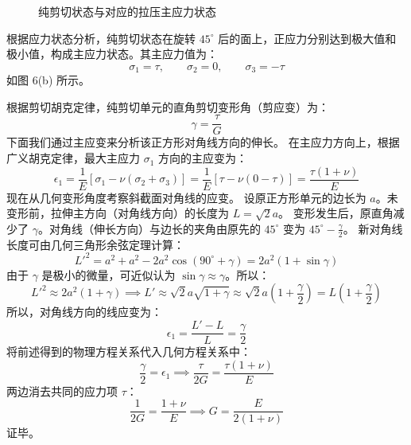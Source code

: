 \documentclass[11pt,a4paper]{ctexrep}
\begin{document}
{\begin{figure}[H]
\caption{纯剪切状态与对应的拉压主应力状态}
\end{figure}

根据应力状态分析，纯剪切状态在旋转 $45^\circ$ 后的面上，正应力分别达到极大值和极小值，构成主应力状态。其主应力值为：
\[
    \sigma_1 = \tau, \qquad \sigma_2 = 0, \qquad \sigma_3 = -\tau
\]
如图 6(b) 所示。

根据剪切胡克定律，纯剪切单元的直角剪切变形角（剪应变）为：
\[
    \gamma = \frac{\tau}{G}
\]
下面我们通过主应变来分析该正方形对角线方向的伸长。
在主应力方向上，根据广义胡克定律，最大主应力 $\sigma_1$ 方向的主应变为：
\[
    \epsilon_1 = \frac{1}{E} \left[ \sigma_1 - \nu (\sigma_2 + \sigma_3) \right] = \frac{1}{E} \left[ \tau - \nu (0 - \tau) \right] = \frac{\tau (1 + \nu)}{E}
\]
现在从几何变形角度考察斜截面对角线的应变。
设原正方形单元的边长为 $a$。未变形前，拉伸主方向（对角线方向）的长度为 $L = \sqrt{2}a$。
变形发生后，原直角减少了 $\gamma$。对角线（伸长方向）与边长的夹角由原先的 $45^\circ$ 变为 $45^\circ - \frac{\gamma}{2}$。
新对角线长度可由几何三角形余弦定理计算：
\[
    L'^2 = a^2 + a^2 - 2a^2 \cos\left(90^\circ + \gamma\right) = 2a^2 (1 + \sin\gamma)
\]
由于 $\gamma$ 是极小的微量，可近似认为 $\sin\gamma \approx \gamma$。所以：
\[
    L'^2 \approx 2a^2 (1 + \gamma) \implies L' \approx \sqrt{2}a \sqrt{1 + \gamma} \approx \sqrt{2}a \left( 1 + \frac{\gamma}{2} \right)
  = L \left( 1 + \frac{\gamma}{2} \right)
\]
所以，对角线方向的线应变为：
\[
    \epsilon_1 = \frac{L' - L}{L} = \frac{\gamma}{2}
\]
将前述得到的物理方程关系代入几何方程关系中：
\[
    \frac{\gamma}{2} = \epsilon_1 \implies \frac{\tau}{2G} = \frac{\tau (1 + \nu)}{E}
\]
两边消去共同的应力项 $\tau$：
\[
    \frac{1}{2G} = \frac{1 + \nu}{E} \implies G = \frac{E}{2(1 + \nu)}
\]
证毕。




}
\end{document}
